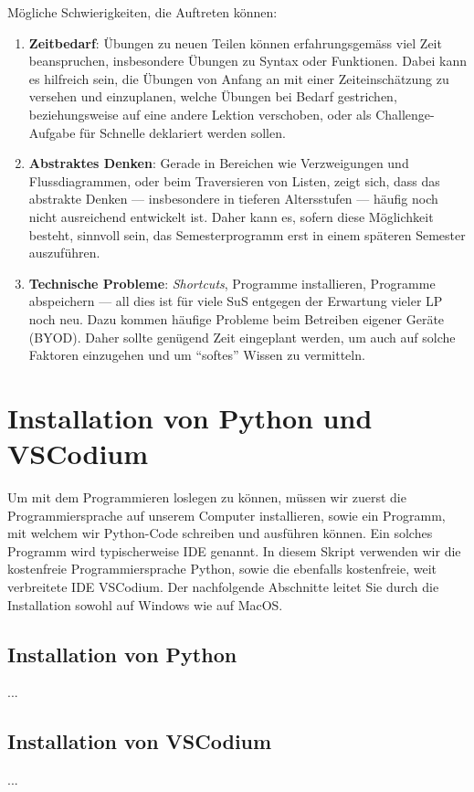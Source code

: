 Mögliche Schwierigkeiten, die Auftreten können:
\begin{enumerate}
\item \textbf{Zeitbedarf}: Übungen zu neuen Teilen können erfahrungsgemäss viel Zeit beanspruchen, insbesondere Übungen zu Syntax oder Funktionen. Dabei kann es hilfreich sein, die Übungen von Anfang an mit einer Zeiteinschätzung zu versehen und einzuplanen, welche Übungen bei Bedarf gestrichen, beziehungsweise auf eine andere Lektion verschoben, oder als Challenge-Aufgabe für Schnelle deklariert werden sollen.
\item \textbf{Abstraktes Denken}: Gerade in Bereichen wie Verzweigungen und Flussdiagrammen, oder beim Traversieren von Listen, zeigt sich, dass das abstrakte Denken --- insbesondere in tieferen Altersstufen --- häufig noch nicht ausreichend entwickelt ist. Daher kann es, sofern diese Möglichkeit besteht, sinnvoll sein, das Semesterprogramm erst in einem späteren Semester auszuführen.
\item \textbf{Technische Probleme}: \textit{Shortcuts}, Programme installieren, Programme abspeichern --- all dies ist für viele SuS entgegen der Erwartung vieler LP noch neu. Dazu kommen häufige Probleme beim Betreiben eigener Geräte (BYOD). Daher sollte genügend Zeit eingeplant werden, um auch auf solche Faktoren einzugehen und um ``softes'' Wissen zu vermitteln.
\end{enumerate}

\clearpage

\tableofcontents
\clearpage
\section*{Installation von Python und VSCodium}
Um mit dem Programmieren loslegen zu können, müssen wir zuerst die Programmiersprache auf unserem Computer installieren, sowie ein Programm, mit welchem wir Python-Code schreiben und ausführen können. Ein solches Programm wird typischerweise \gls{IDE} genannt. In diesem Skript verwenden wir die kostenfreie Programmiersprache Python, sowie die ebenfalls kostenfreie, weit verbreitete \gls{IDE} VSCodium. Der nachfolgende Abschnitte leitet Sie durch die Installation sowohl auf Windows wie auf MacOS.

\subsection*{Installation von Python}
...

\subsection*{Installation von VSCodium}
...

